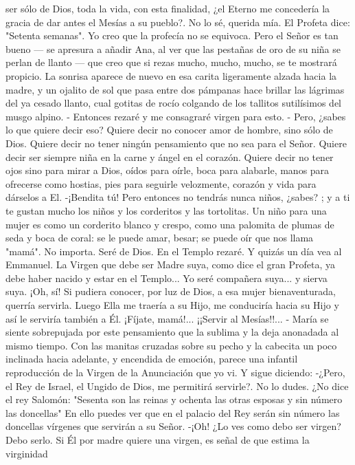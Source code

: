 \documentclass[12pt]{book} %
\begin{document}
ser sólo de Dios, toda la vida, con esta finalidad, ¿el Eterno me concedería la gracia de dar antes el Mesías a su pueblo?. 
No lo sé, querida mía. El Profeta dice: "Setenta semanas". Yo creo que la profecía no se equivoca. Pero el Señor es tan 
bueno — se apresura a añadir Ana, al ver que las pestañas de oro de su niña se perlan de llanto — que creo que si rezas mucho, mucho, mucho, se te mostrará propicio. 
La sonrisa aparece de nuevo en esa carita ligeramente alzada hacia la madre, y un ojalito de sol que pasa entre dos 
pámpanas hace brillar las lágrimas del ya cesado llanto, cual gotitas de rocío colgando de los tallitos sutilísimos del musgo alpino. - Entonces rezaré y me consagraré virgen para esto. - Pero, ¿sabes lo que quiere decir eso? 
Quiere decir no conocer amor de hombre, sino sólo de Dios. Quiere decir no tener ningún pensamiento que no sea 
para el Señor. Quiere decir ser siempre niña en la carne y ángel en el corazón. Quiere decir no tener ojos sino para mirar a Dios, oídos para oírle, boca para alabarle, manos para ofrecerse como hostias, pies para seguirle velozmente, corazón y vida para dárselos a El. 
-¡Bendita tú! Pero entonces no tendrás nunca niños, ¿sabes? ; y a ti te gustan mucho los niños y los corderitos y las 
tortolitas. Un niño para una mujer es como un corderito blanco y crespo, como una palomita de plumas de seda y boca de coral: se le puede amar, besar; se puede oír que nos llama "mamá". 
No importa. Seré de Dios. En el Templo rezaré. Y quizás un día vea al Emmanuel. La Virgen que debe ser Madre suya, como dice el gran Profeta, ya debe haber nacido y estar en el Templo... Yo seré compañera suya... y sierva suya. ¡Oh, sí! Si pudiera conocer, por luz de Dios, a esa mujer bienaventurada, querría servirla. Luego Ella me traería a su Hijo, me conduciría hacia su Hijo y así le serviría también a Él. ¡Fíjate, mamá!... ¡¡Servir al Mesías!!... - María se siente sobrepujada por este pensamiento que la sublima y la deja anonadada al mismo tiempo. Con las manitas cruzadas sobre su pecho y la cabecita un poco inclinada hacia adelante, y encendida de emoción, parece una infantil reproducción de la Virgen de la Anunciación que yo vi. Y sigue diciendo: 
-¿Pero, el Rey de Israel, el Ungido de Dios, me permitirá servirle?. 
No lo dudes. ¿No dice el rey Salomón: "Sesenta son las reinas y ochenta las otras esposas y sin número las doncellas" En ello puedes ver que en el palacio del Rey serán sin número las doncellas vírgenes que servirán a su Señor. 
-¡Oh! ¿Lo ves como debo ser virgen? Debo serlo. Si Él por madre quiere una virgen, es señal de que estima la virginidad 
\end{document}
